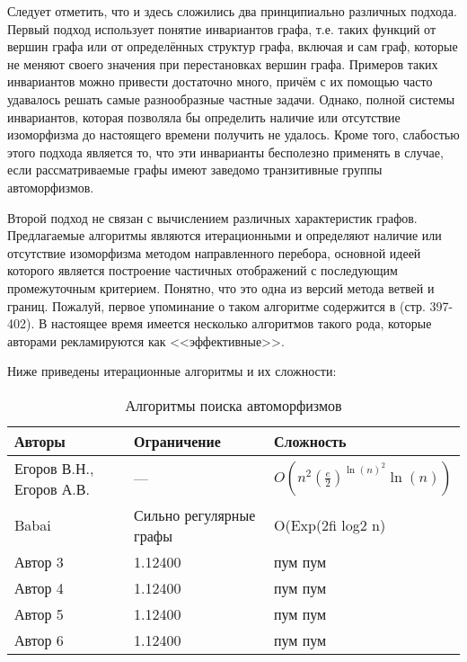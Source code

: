 Следует отметить, что и здесь сложились два принципиально различных подхода. Первый подход использует понятие инвариантов графа, т.е. таких функций от вершин графа или от определённых структур графа, включая и сам граф, которые не меняют своего значения при перестановках вершин графа. Примеров таких инвариантов можно привести достаточно много, причём с их помощью часто удавалось решать самые разнообразные частные задачи. Однако, полной системы инвариантов, которая позволяла бы определить наличие или отсутствие изоморфизма до настоящего времени получить не удалось. Кроме того, слабостью этого подхода является то, что эти инварианты бесполезно применять в случае, если рассматриваемые графы имеют заведомо транзитивные группы автоморфизмов.

Второй подход не связан с вычислением различных характеристик графов. Предлагаемые алгоритмы являются итерационными и определяют наличие или отсутствие изоморфизма методом направленного перебора, основной идеей которого является построение частичных отображений с последующим промежуточным критерием. Понятно, что это одна из версий метода ветвей и границ. Пожалуй, первое упоминание о таком алгоритме содержится в \cite{Book_Reingold} (стр. 397-402). В настоящее время имеется несколько алгоритмов такого рода, которые авторами рекламируются как <<эффективные>>.

Ниже приведены итерационные алгоритмы и их сложности:

\begin{table}[h]
\centering
\begin{tabular}[t]{|l|l|l|}
\hline
\textbf{Авторы} & \textbf{Ограничение} & \textbf{Сложность}\\
\hline
Егоров В.Н., Егоров А.В. \cite{ArtMain_Egorov} & --- & $O(n^2(\frac{e}{2})^{\ln(n)^2} \ln(n))$\\
\hline
Babai \cite{ArtSrg_Babai}& Сильно регулярные графы & O(Exp(2fi log2 n)\\
\hline
Автор 3 & 1.12400 & пум пум\\
\hline
Автор 4 & 1.12400 & пум пум\\
\hline
Автор 5 & 1.12400 & пум пум\\
\hline
Автор 6 & 1.12400 & пум пум\\
\hline
\end{tabular}
\caption{Алгоритмы поиска автоморфизмов}
\label{tabular:algos}
\end{table}

